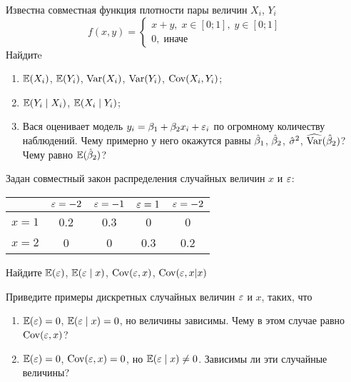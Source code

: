 \begin{problem}
Известна совместная функция плотности пары величин $X_i$, $Y_i$
\[
f(x,y)=
\begin{cases}
x+y, \; x\in[0;1], \; y\in [0;1] \\
0, \; \text{иначе}
\end{cases}
\]
Найдитe
\begin{enumerate}
\item $\mathbb{E}(X_i)$, $\mathbb{E}(Y_i)$, $\operatorname{Var}(X_i)$, $\operatorname{Var}(Y_i)$, $\operatorname{Cov}(X_i,Y_i)$;
\item $\mathbb{E}(Y_i \mid X_i)$, $\mathbb{E}(X_i \mid Y_i)$;
\item Вася оценивает модель $y_i=\beta_1+\beta_2 x_i+\varepsilon_i$ по огромному количеству наблюдений. Чему примерно у него окажутся равны $\hat{\beta}_1$, $\hat{\beta}_2$, $\hat{\sigma}^2$, $\widehat{\operatorname{Var}}(\hat{\beta}_2)$? Чему равно $\mathbb{E}(\hat{\beta}_2)$?
\end{enumerate}


\begin{sol}
\end{sol}
\end{problem}


\begin{problem}
Задан совместный закон распределения случайных величин $x$ и $\varepsilon$:

\begin{tabular}{c|cccc}
\toprule
 & $\varepsilon=-2$ & $\varepsilon=-1$ & $\varepsilon=1$ & $\varepsilon=-2$ \\
\midrule
$x=1$ & 0.2 & 0.3 & 0 & 0 \\
$x=2$ & 0 & 0 & 0.3 & 0.2 \\
\bottomrule
\end{tabular}

Найдите $\mathbb{E}(\varepsilon)$, $\mathbb{E}(\varepsilon \mid x)$, $\operatorname{Cov}(\varepsilon,x)$, $\operatorname{Cov}(\varepsilon,x|x)$


\begin{sol}
\end{sol}
\end{problem}


\begin{problem}
Приведите примеры дискретных случайных величин $\varepsilon$ и $x$, таких, что
\begin{enumerate}
\item $\mathbb{E}(\varepsilon)=0$, $\mathbb{E}(\varepsilon\mid x)=0$, но величины зависимы. Чему в этом случае равно $\operatorname{Cov}(\varepsilon,x)$?
\item $\mathbb{E}(\varepsilon)=0$, $\operatorname{Cov}(\varepsilon,x)=0$, но $\mathbb{E}(\varepsilon\mid x)\neq 0$. Зависимы ли эти случайные величины?
\end{enumerate}


\begin{sol}
\end{sol}
\end{problem}



